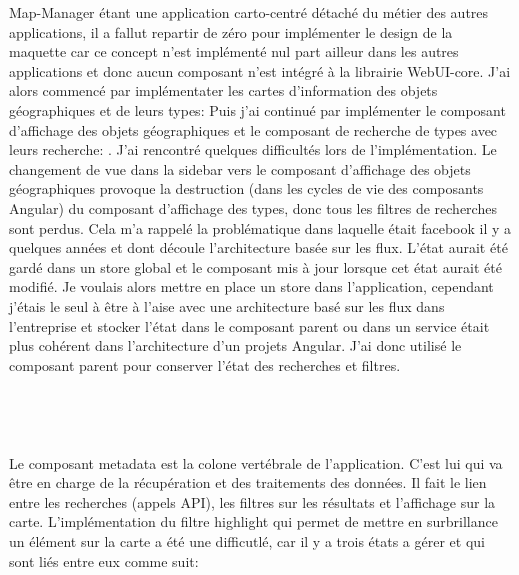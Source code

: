 \documentclass{rapportUHA40}
\begin{document}
Map-Manager étant une application carto-centré détaché du métier des autres
applications, il a fallut repartir de zéro pour implémenter le design de la
maquette car ce concept n'est implémenté nul part ailleur dans les autres
applications et donc aucun composant n'est intégré à la librairie WebUI-core.
J'ai alors commencé par implémentater les cartes d'information des objets
géographiques et de leurs types:  Puis j'ai continué par implémenter le
composant d'affichage des objets géographiques et le composant de recherche de
types avec leurs recherche:
. J'ai rencontré quelques
difficultés lors de l'implémentation. Le changement de vue dans la sidebar vers
le composant d'affichage des objets géographiques provoque la destruction (dans
les cycles de vie des composants Angular) du composant d'affichage des types,
donc tous les filtres de recherches sont perdus. Cela m'a rappelé la
problématique dans laquelle était facebook il y a quelques années et dont
découle l'architecture basée sur les flux. L'état aurait été gardé dans un
store global et le composant mis à jour lorsque cet état aurait été modifié. Je
voulais alors mettre en place un store dans l'application, cependant j'étais le
seul à être à l'aise avec une architecture basé sur les flux dans l'entreprise
et stocker l'état dans le composant parent ou dans un service était plus
cohérent dans l'architecture d'un projets Angular. J'ai donc utilisé le
composant parent pour conserver l'état des recherches et filtres. \\\\\\\\\\

Le composant metadata est la colone vertébrale de l'application. C'est lui qui
va être en charge de la récupération et des traitements des données. Il fait le
lien entre les recherches (appels API), les filtres sur les résultats et
l'affichage sur la carte. L'implémentation du filtre highlight qui permet de
mettre en surbrillance un élément sur la carte a été une difficutlé, car il y a
trois états a gérer et qui sont liés entre eux comme suit:
\end{document}
